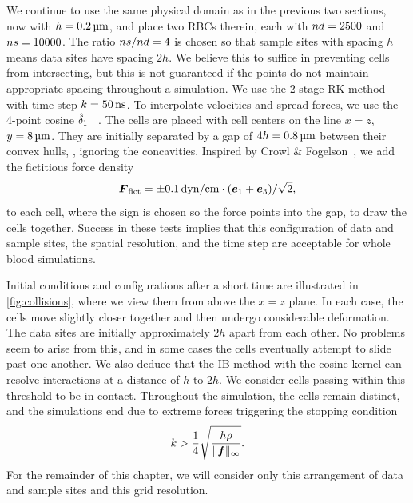 We continue to use the same physical domain as in the previous two sections, now with $h = 0.2\um$, and place two
RBCs therein, each with $\data\cardinality=2500$ and $\sample\cardinality=10000$. The ratio
$\sample\cardinality/\data\cardinality=4$ is chosen so that sample sites with spacing $h$ means data sites have
spacing $2h$. We believe this to suffice in preventing cells from intersecting, but this is not guaranteed if the
points do not maintain appropriate spacing throughout a simulation. We use the 2-stage RK method with time step
$\timestep = 50\ns$. To interpolate velocities and spread forces, we use the 4-point cosine $\hat{\delta}_1$~%
\cite{Peskin:2002go}. The cells are placed with cell centers on the line $x = z$, $y = 8\um$. They are initially
separated by a gap of $4h = 0.8\um$ between their convex hulls, , ignoring the concavities. Inspired
by Crowl \& Fogelson~\cite{Erickson:2011cf}, we add the fictitious force density
\begin{equation*}
    \F_\text{fict} = \pm 0.1\dynpercm\cdot(\e_1+\e_3)/\sqrt{2},
\end{equation*}
to each cell, where the sign is chosen so the force points into the gap, to draw the cells together. Success in
these tests implies that this configuration of data and sample sites, the spatial resolution, and the time step
are acceptable for whole blood simulations.

Initial conditions and configurations after a short time are illustrated in \cref{fig:collisions}, where we view
them from above the $x=z$ plane. In each case, the cells move slightly closer together and then undergo
considerable deformation. The data sites are initially approximately $2h$ apart from each other. No problems seem
to arise from this, and in some cases the cells eventually attempt to slide past one another.  We also deduce that
the IB method with the cosine kernel can resolve interactions at a distance of $h$ to $2h$. We consider cells
passing within this threshold to be in contact. Throughout the simulation, the cells remain distinct, and the
simulations end due to extreme forces triggering the stopping condition~\cite{Agresar:1998wv}
\begin{equation}
    k > \frac14\sqrt{\frac{h\rho}{\|\boldsymbol{f}\|_\infty}}.
\end{equation}
For the remainder of this chapter, we will consider only this arrangement of data and sample sites and this grid
resolution.
